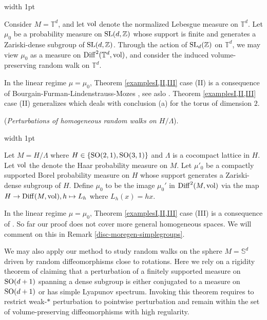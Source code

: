 \documentclass[11pt, leqno, fleqn]{amsart}
\def\SL{   {\rm SL}}
\def\SO{   {\rm SO}}
\def \Z{{\mathbb Z}}
\newcommand{\T}{{\mathbb T}}
\theoremstyle{definition}
\theoremstyle{definition}
\def\S{ {\mathbb{S}} }
\def \vol{  {\rm vol} }
\newcommand{\Diff}{{\rm Diff}}
\begin{document}
		\noindent
\vrule width 1pt\hspace{0.4em}
\parbox{0.9\linewidth}{
Consider $M = \T^d$, and let $\vol$ denote the  normalized  Lebesgue measure on $\T^d$.
	Let $\mu_0$ be a probability measure on $\SL(d, \Z)$ whose support  is finite and generates a Zariski-dense subgroup of $\SL(d, \Z)$. 	Through the action of $\SL_{d}(\Z)$ on $\T^d$, we may view $\mu_{0}$ as a measure on  $\Diff^{2}(\T^d,\vol)$, and consider the induced volume-preserving random walk on $\T^d$.		 
}
	\bigskip		
	
	In the linear regime   $\mu=\mu_{0}$, Theorem \ref{examplesI,II,III} case (II)  is a consequence of Bourgain-Furman-Lindenstrauss-Mozes \cite{BFLM}, see aslo \cite{BQ1}. 
	Theorem \ref{examplesI,II,III} case (II) generalizes \cite[Theorem A]{BLOR2} which deals with conclusion (a) for the torus of  dimension $2$. 


 	
 
		
		\bigskip		
 	 (\emph{Perturbations of homogeneous random walks on  $H / \Lambda$}).
	
		\noindent
\vrule width 1pt\hspace{0.4em}
\parbox{0.9\linewidth}{Let $M=H/ \Lambda$ where $H\in \{ \SO(2,1), \SO(3,1)\}$ and $\Lambda$ is a cocompact lattice in $H$. Let $\vol$ the denote the Haar probability measure on $M$.   Let $\mu'_0$ be a compactly supported Borel probability measure on $H$ whose support  generates a Zariski-dense subgroup of $H$. Define $\mu_{0}$ to be the image $\mu_{0}'$  in $\Diff^{ 2}(M, \vol)$ via the map $H\rightarrow \Diff(M, \vol), h\mapsto L_{h}$ where  $L_h(x) = hx$. }
		 
\bigskip	
	In the linear regime   $\mu=\mu_{0}$, Theorem \ref{examplesI,II,III} case (III)   is a consequence of \cite{BH1}. 
	 	So far our proof does not cover more general homogeneous spaces.  We will comment on this in Remark \ref{disc-moregen-simplegroups}.
	 \bigskip


  \bigskip
We may also apply our method to study random walks on the sphere $M=\S^d$ driven by random diffeomorphisms close to   rotations. Here we rely on a rigidity theorem of \cite{DK} claiming that a perturbation of a finitely supported measure on $\SO(d+1)$ spanning a dense subgroup is either conjugated to a measure on $\SO(d+1)$ or has simple Lyapunov spectrum. 	Invoking this theorem requires to restrict weak-$*$ perturbation to pointwise perturbation and remain within the set of volume-preserving diffeomorphisms with high regularity. 
  					
\end{document}
